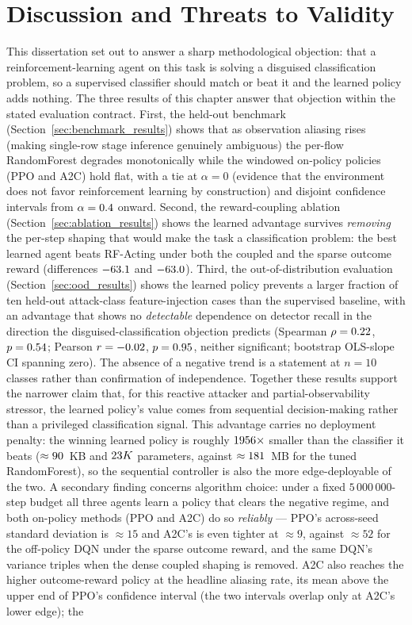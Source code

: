\section{Discussion and Threats to Validity}\label{sec:discussion}
This dissertation set out to answer a sharp methodological objection: that a reinforcement-learning agent on this task is solving a disguised classification problem, so a supervised classifier should match or beat it and the learned policy adds nothing. The three results of this chapter answer that objection within the stated evaluation contract. First, the held-out benchmark (Section~\ref{sec:benchmark_results}) shows that as observation aliasing rises (making single-row stage inference genuinely ambiguous) the per-flow RandomForest degrades monotonically while the windowed on-policy policies (PPO and A2C) hold flat, with a tie at $\alpha = 0$ (evidence that the environment does not favor reinforcement learning by construction) and disjoint confidence intervals from $\alpha = 0.4$ onward. Second, the reward-coupling ablation (Section~\ref{sec:ablation_results}) shows the learned advantage survives \emph{removing} the per-step shaping that would make the task a classification problem: the best learned agent beats RF-Acting under both the coupled and the sparse outcome reward (differences $-63.1$ and $-63.0$). Third, the out-of-distribution evaluation (Section~\ref{sec:ood_results}) shows the learned policy prevents a larger fraction of ten held-out attack-class feature-injection cases than the supervised baseline, with an advantage that shows no \emph{detectable} dependence on detector recall in the direction the disguised-classification objection predicts (Spearman $\rho = 0.22$, $p = 0.54$; Pearson $r = -0.02$, $p = 0.95$, neither significant; bootstrap OLS-slope CI spanning zero). The absence of a negative trend is a statement at $n=10$ classes rather than confirmation of independence. Together these results support the narrower claim that, for this reactive attacker and partial-observability stressor, the learned policy's value comes from sequential decision-making rather than a privileged classification signal. This advantage carries no deployment penalty: the winning learned policy is roughly $1956\times$ smaller than the classifier it beats ($\approx90$~KB and $23K$ parameters, against $\approx181$~MB for the tuned RandomForest), so the sequential controller is also the more edge-deployable of the two. A secondary finding concerns algorithm choice: under a fixed $5\,000\,000$-step budget all three agents learn a policy that clears the negative regime, and both on-policy methods (PPO and A2C) do so \emph{reliably} --- PPO's across-seed standard deviation is $\approx 15$ and A2C's is even tighter at $\approx 9$, against $\approx 52$ for the off-policy DQN under the sparse outcome reward, and the same DQN's variance triples when the dense coupled shaping is removed. A2C also reaches the higher outcome-reward policy at the headline aliasing rate, its mean above the upper end of PPO's confidence interval (the two intervals overlap only at A2C's lower edge); the 